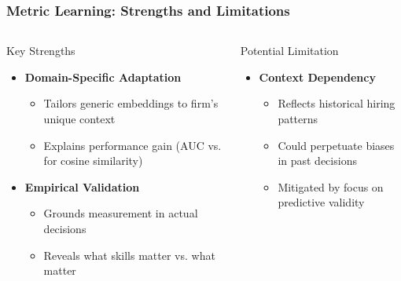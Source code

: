 \documentclass[11pt,xcolor={dvipsnames},hyperref={pdftex,pdfpagemode=UseNone,hidelinks,pdfdisplaydoctitle=true},usepdftitle=false]{beamer}
\begin{document}
\begin{frame}
\frametitle{Metric Learning: Strengths and Limitations}
\begin{columns}
\begin{column}{0.48\textwidth}
\begin{block}{Key Strengths}
\begin{itemize}
\item \textbf{Domain-Specific Adaptation}
\begin{itemize}
\item Tailors generic embeddings to firm's unique context
\item Explains performance gain (AUC  vs.  for cosine similarity)
\end{itemize}

\item \textbf{Empirical Validation}
\begin{itemize}
\item Grounds measurement in actual decisions
\item Reveals what skills  matter vs. what  matter
\end{itemize}
\end{itemize}
\end{block}
\end{column}

\begin{column}{0.48\textwidth}
\begin{block}{Potential Limitation}
\begin{itemize}
\item \textbf{Context Dependency}
\begin{itemize}
\item Reflects historical hiring patterns
\item Could perpetuate biases in past decisions
\item Mitigated by focus on predictive validity
\end{itemize}
\end{itemize}
\end{block}
\end{column}
\end{columns}
\end{frame}

\end{document}
